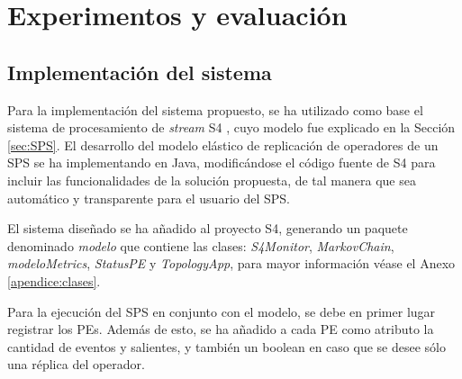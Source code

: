 \chapter{Experimentos y evaluación}
\label{cap:experimentos}

\section{Implementación del sistema}
Para la implementación del sistema propuesto, se ha utilizado como base el sistema de procesamiento de \textit{stream} S4 \citep{s4}, cuyo modelo fue explicado en la Sección \ref{sec:SPS}. El desarrollo del modelo elástico de replicación de operadores de un SPS se ha implementando en Java, modificándose el código fuente de S4 para incluir las funcionalidades de la solución propuesta, de tal manera que sea automático y transparente para el usuario del SPS.

El sistema diseñado se ha añadido al proyecto S4, generando un paquete denominado \textit{modelo} que contiene las clases: \textit{S4Monitor}, \textit{MarkovChain}, \textit{modeloMetrics}, \textit{StatusPE} y \textit{\mbox{TopologyApp}}, para mayor información véase el Anexo \ref{apendice:clases}.

Para la ejecución del SPS en conjunto con el modelo, se debe en primer lugar registrar los PEs. Además de esto, se ha añadido a cada PE como atributo la cantidad de eventos y salientes, y también un boolean en caso que se desee sólo una réplica del operador.


